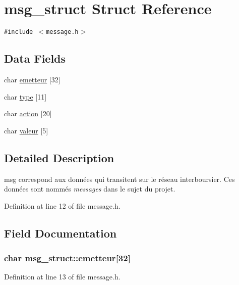 \hypertarget{structmsg__struct}{
\section{msg\_\-struct Struct Reference}
\label{structmsg__struct}
}
{\tt \#include $<$message.h$>$}

\subsection*{Data Fields}
\begin{CompactItemize}
\item 
char \hyperlink{structmsg__struct_63bd710310c42f1758e497179ae443be}{emetteur} \mbox{[}32\mbox{]}
\item 
char \hyperlink{structmsg__struct_b1bee85c89cf3c52f0a4343675f76038}{type} \mbox{[}11\mbox{]}
\item 
char \hyperlink{structmsg__struct_6863e9ef8f00f38466c33643798b2652}{action} \mbox{[}20\mbox{]}
\item 
char \hyperlink{structmsg__struct_388703005dfbdfb61b6c5eb72b25f535}{valeur} \mbox{[}5\mbox{]}
\end{CompactItemize}


\subsection{Detailed Description}
msg correspond aux données qui transitent sur le réseau interboursier. Ces données sont nommés {\em messages\/} dans le sujet du projet. 

Definition at line 12 of file message.h.

\subsection{Field Documentation}
\hypertarget{structmsg__struct_63bd710310c42f1758e497179ae443be}{
\subsubsection{\setlength{\rightskip}{0pt plus 5cm}char {\bf msg\_\-struct::emetteur}\mbox{[}32\mbox{]}}}
\label{structmsg__struct_63bd710310c42f1758e497179ae443be}




Definition at line 13 of file message.h.

